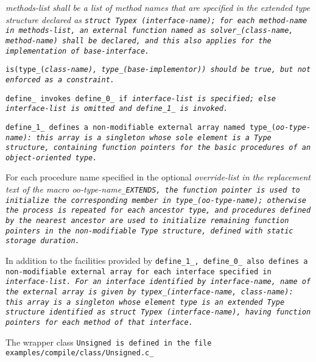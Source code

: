 \it{methods-list} shall be a list of method names that are specified in the
extended type structure declared as \tt{struct Typex (}\it{interface-name}\tt{)};
for each \it{method-name} in \it{methods-list}, an external function named
as \tt{solver_(}\it{class-name}\tt{,} \it{method-name}\tt{)} shall be declared,
and this also applies for the implementation of \it{base-interface}.

\note \tt{is(type_(}\it{class-name}\tt{), type_(}\it{base-implementor}\tt{))}
should be \tt{true}, but not enforced as a constraint.


\tt{define_} invokes \tt{define_0_} if \it{interface-list} is specified;
else \it{interface-list} is omitted and \tt{define_1_} is invoked.

\tt{define_1_} defines a non-modifiable external array
named \tt{type_(}\it{oo-type-name}\tt{)}:
this array is a singleton whose sole element is a \tt{Type} structure,
containing function pointers for the basic procedures of an object-oriented type.

For each procedure name specified in the optional \it{override-list}
in the replacement text of the macro \it{oo-type-name}\tt{_EXTENDS},
the function pointer is used to initialize the corresponding member
in \tt{type_(}\it{oo-type-name}\tt{)}; otherwise the process is
repeated for each ancestor type, and procedures defined by the nearest
ancestor are used to initialize remaining function pointers in the
non-modifiable \tt{Type} structure, defined with static storage duration.

In addition to the facilities provided by \tt{define_1_},
\tt{define_0_} also defines a non-modifiable external
array for each interface specified in \it{interface-list}.
For an interface identified by \it{interface-name}, name of the external array
is given by \tt{typex_(}\it{interface-name}\tt{,} \it{class-name}\tt{)}:
this array is a singleton whose element type is an extended \tt{Type}
structure identified as \tt{struct Typex (}\it{interface-name}\tt{)},
having function pointers for each method of that interface.

\example The wrapper class \tt{Unsigned} is defined in the file
\tt{examples/compile/class/Unsigned.c_}

